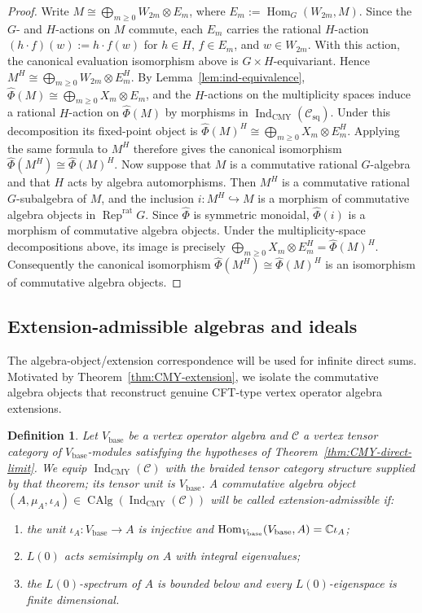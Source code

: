 \documentclass[10pt,a4paper]{amsart}
\numberwithin{equation}{section} \newtheorem{thm}{Theorem}[section] \newtheorem{lem}[thm]{Lemma} \newtheorem{ex}[thm]{Example} \newtheorem{prop}[thm]{Proposition} \newtheorem{cor}[thm]{Corollary} \newtheorem{defi}[thm]{Definition} \newtheorem{rmk}[thm]{Remark} \newtheorem{notation}[thm]{Notation}
\newcommand{\Rep}{\operatorname{Rep}}
\newcommand{\Hom}{\operatorname{Hom}}
\newcommand{\Csq}{\mathcal C_{\mathrm{sq}}}
\newcommand{\CAlg}{\operatorname{CAlg}}
\newcommand{\IndCMY}{\operatorname{Ind}_{\mathrm{CMY}}}
\begin{document}
\begin{proof}
Write \(M\cong\bigoplus_{m\ge0}W_{2m}\otimes E_m\), where \(E_m:=\Hom_G(W_{2m},M)\). Since the $G$- and $H$-actions on $M$ commute, each $E_m$ carries the rational $H$-action \((h\cdot f)(w):=h\cdot f(w)\) for $h\in H$, $f\in E_m$, and $w\in W_{2m}$. With this action, the canonical evaluation isomorphism above is $G\times H$-equivariant. Hence \(M^H\cong\bigoplus_{m\ge0}W_{2m}\otimes E_m^H\). By Lemma~\ref{lem:ind-equivalence}, \(\widehat\Phi(M)\cong\bigoplus_{m\ge0}X_m\otimes E_m\), and the $H$-actions on the multiplicity spaces induce a rational $H$-action on $\widehat\Phi(M)$ by morphisms in $\IndCMY(\Csq)$. Under this decomposition its fixed-point object is \(\widehat\Phi(M)^H\cong\bigoplus_{m\ge0}X_m\otimes E_m^H\). Applying the same formula to $M^H$ therefore gives the canonical isomorphism \(\widehat\Phi(M^H)\cong\widehat\Phi(M)^H\). Now suppose that $M$ is a commutative rational $G$-algebra and that $H$ acts by algebra automorphisms. Then $M^H$ is a commutative rational $G$-subalgebra of $M$, and the inclusion \(i:M^H\hookrightarrow M\) is a morphism of commutative algebra objects in $\Rep^{\mathrm{rat}}G$. Since $\widehat\Phi$ is symmetric monoidal, $\widehat\Phi(i)$ is a morphism of commutative algebra objects. Under the multiplicity-space decompositions above, its image is precisely \(\bigoplus_{m\ge0}X_m\otimes E_m^H=\widehat\Phi(M)^H\). Consequently the canonical isomorphism \(\widehat\Phi(M^H)\cong\widehat\Phi(M)^H\) is an isomorphism of commutative algebra objects.
\end{proof}

\subsection{Extension-admissible algebras and ideals}

The algebra-object/extension correspondence will be used for infinite direct sums. Motivated by Theorem~\ref{thm:CMY-extension}, we isolate the commutative algebra objects that reconstruct genuine CFT-type vertex operator algebra extensions.

\begin{defi}\label{def:extension-admissible}
Let $V_{\mathrm{base}}$ be a vertex operator algebra and $\mathcal C$ a vertex tensor category of $V_{\mathrm{base}}$-modules satisfying the hypotheses of Theorem~\ref{thm:CMY-direct-limit}. We equip $\IndCMY(\mathcal C)$ with the braided tensor category structure supplied by that theorem; its tensor unit is $V_{\mathrm{base}}$. A commutative algebra object $(A,\mu_A,\iota_A)\in\CAlg(\IndCMY(\mathcal C))$ will be called \emph{extension-admissible} if:
\begin{enumerate}[label=(\roman*),leftmargin=2.1em]
\item the unit \(\iota_A:V_{\mathrm{base}}\to A\) is injective and
\(\Hom_{V_{\mathrm{base}}}(V_{\mathrm{base}},A)=\C\iota_A\);
\item $L(0)$ acts semisimply on $A$ with integral eigenvalues;
\item the $L(0)$-spectrum of $A$ is bounded below and every $L(0)$-eigenspace is finite dimensional.
\end{enumerate}
\end{defi}
\end{document}
